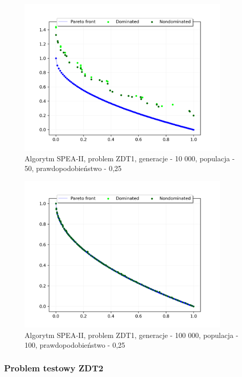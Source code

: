 \documentclass{classrep}
\begin{document}
\begin{figure}[H]
    \centering
    \includegraphics[width=0.9\textwidth]{img2/SPEAII_ZDT1_g10000_p50_r0,25.png}
    \caption{Algorytm SPEA-II, problem ZDT1, \newline generacje - 10 000, populacja - 50, prawdopodobieństwo - 0,25}
\end{figure}

\begin{figure}[H]
    \centering
    \includegraphics[width=0.9\textwidth]{img2/SPEAII_ZDT1_g100000_p100_r0,25.png}
    \caption{Algorytm SPEA-II, problem ZDT1, \newline generacje - 100 000, populacja - 100, prawdopodobieństwo - 0,25}
\end{figure}

\subsubsection{Problem testowy ZDT2}
\end{document}
